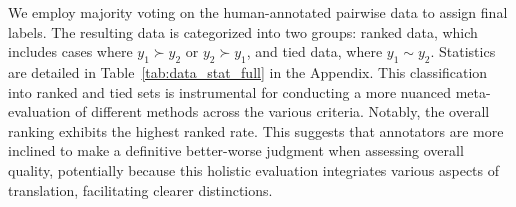 \documentclass{article}
\theoremstyle{plain}
\theoremstyle{definition}
\theoremstyle{remark}
\begin{document}
We employ majority voting on the human-annotated pairwise data to assign final labels. The resulting data is categorized into two groups: ranked data, which includes cases where $y_1 \succ y_2$ or $y_2 \succ y_1$, and tied data, where $y_1 \sim y_2$. Statistics are detailed in Table~\ref{tab:data_stat_full} in the Appendix. This classification into ranked and tied sets is instrumental for conducting a more nuanced meta-evaluation of different methods across the various criteria.
Notably, the overall ranking exhibits the highest ranked rate. This suggests that annotators are more inclined to make a definitive better-worse judgment when assessing overall quality, potentially because this holistic evaluation integriates various aspects of translation, facilitating clearer distinctions.





\begin{table}[t]
    \centering
    \caption{Statistics of human annotations for each criterion. $\kappa$ denotes the value of Fleiss' kappa.}
    \label{tab:human_annotation}
\end{table}
\end{document}
